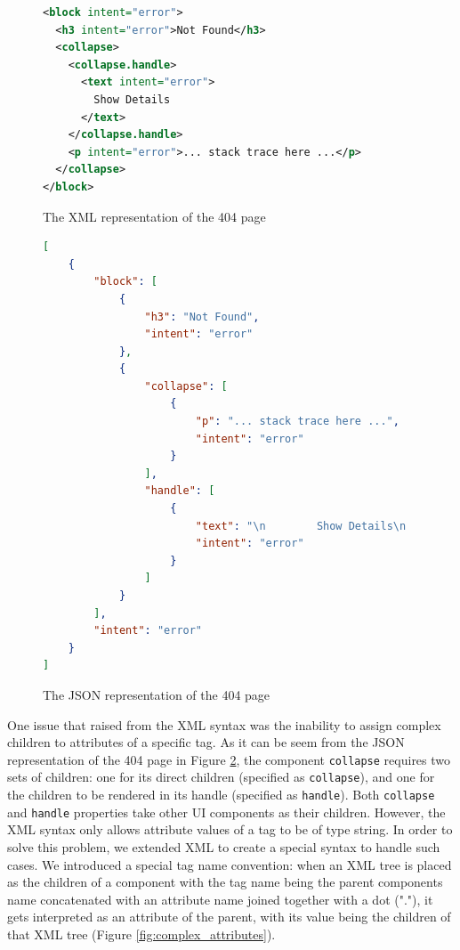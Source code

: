 \begin{figure}
\begin{minipage}{\linewidth}
\begin{lstlisting}[language=xml]
<block intent="error">
  <h3 intent="error">Not Found</h3>
  <collapse>
    <collapse.handle>
      <text intent="error">
        Show Details
      </text>
    </collapse.handle>
    <p intent="error">... stack trace here ...</p>
  </collapse>
</block>
\end{lstlisting}
\end{minipage}
\caption{The XML representation of the 404 page}%
\label{fig:syntax_xml}%
\end{figure}

\begin{figure}
\begin{minipage}{\linewidth}
\begin{lstlisting}[language=json]
[
    {
        "block": [
            {
                "h3": "Not Found",
                "intent": "error"
            },
            {
                "collapse": [
                    {
                        "p": "... stack trace here ...",
                        "intent": "error"
                    }
                ],
                "handle": [
                    {
                        "text": "\n        Show Details\n      ",
                        "intent": "error"
                    }
                ]
            }
        ],
        "intent": "error"
    }
]
\end{lstlisting}
\end{minipage}
\caption{The JSON representation of the 404 page}%
\label{fig:syntax_json}%
\end{figure}


One issue that raised from the XML syntax was the inability to assign complex children to attributes of a specific tag. As it can be seem from the JSON representation of the 404 page in Figure \ref{fig:syntax_json}, the component \texttt{collapse} requires two sets of children: one for its direct children (specified as \texttt{collapse}), and one for the children to be rendered in its handle (specified as \texttt{handle}). Both \texttt{collapse} and \texttt{handle} properties take other UI components as their children. However, the XML syntax only allows attribute values of a tag to be of type string. In order to solve this problem, we extended XML to create a special syntax to handle such cases. We introduced a special tag name convention: when an XML tree is placed as the children of a component with the tag name being the parent components name concatenated with an attribute name joined together with a dot ("."), it gets interpreted as an attribute of the parent, with its value being the children of that XML tree (Figure \ref{fig:complex_attributes}).

